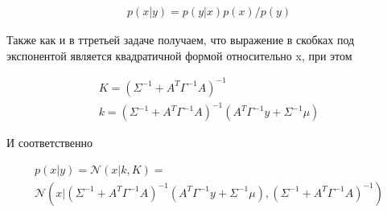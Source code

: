 \begin{gather*}
	p(x|y) = p(y|x) p(x) / p(y)
\end{gather*}

Также как и в ттретьей задаче получаем, что выражение в скобках под экспонентой является квадратичной формой относительно x, при этом 

\begin{gather*}
	K = (\Sigma^{-1}+A^T\Gamma^{-1}A)^{-1} \\
	k = (\Sigma^{-1}+A^T\Gamma^{-1}A)^{-1} (A^T \Gamma^{-1}y + \Sigma^{-1}\mu)
\end{gather*}

И соответственно 

\begin{gather*}
	p(x|y) = \mathcal{N} (x|k, K) = \\
	\mathcal{N} (x|(\Sigma^{-1}+A^T\Gamma^{-1}A)^{-1} (A^T \Gamma^{-1}y + \Sigma^{-1}\mu), (\Sigma^{-1}+A^T\Gamma^{-1}A)^{-1})
\end{gather*}